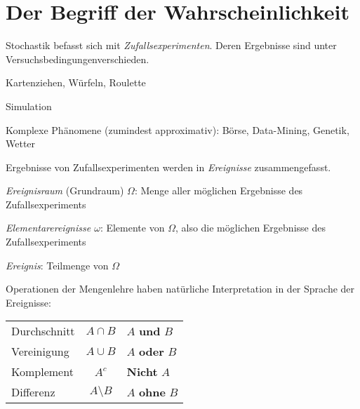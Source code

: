 \chapter{Der Begriff der Wahrscheinlichkeit}
\label{kap1}
Stochastik befasst sich mit \emph{Zufallsexperimenten}. Deren Ergebnisse sind unter \glqq Versuchsbedingungen\grqq verschieden.
\begin{bspl}
	\begin{compactitem}
		\item Kartenziehen, Würfeln, Roulette
		\item Simulation
		\item Komplexe Phänomene (zumindest approximativ): Börse, Data-Mining, Genetik, Wetter
	\end{compactitem}
\end{bspl}
Ergebnisse von Zufallsexperimenten werden in \emph{Ereignisse} zusammengefasst.
\begin{compactitem}
	\item \emph{Ereignisraum} (Grundraum) $\Omega$: Menge aller möglichen Ergebnisse des Zufallsexperiments
	\item \emph{Elementarereignisse $\omega$}: Elemente von $\Omega$, also die möglichen Ergebnisse des Zufallsexperiments
	\item \emph{Ereignis}: Teilmenge von $\Omega$
	\item Operationen der Mengenlehre haben natürliche Interpretation in der Sprache der Ereignisse:
	\begin{tabular}{|l|c|l|}
		\hline
		Durchschnitt	& $A\cap B$			& $A$ \textbf{und} $B$	\\
		Vereinigung		& $A\cup B$			& $A$ \textbf{oder} $B$	\\
		Komplement		& $A^c$				& \textbf{Nicht} $A$	\\
		Differenz		& $A\setminus B$	& $A$ \textbf{ohne} $B$ \\
		\hline
	\end{tabular}
\end{compactitem}

